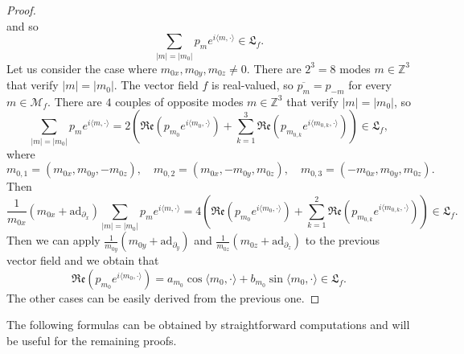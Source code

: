 \documentclass[10pt]{article}
\newcommand{\p}{\partial}
\newcommand{\Z}{{\mathbb Z}}
\newcommand{\M}{{\mathcal M}}
\newcommand{\ov}{\overline}
\newcommand{\la}{\langle}
\newcommand{\ra}{\rangle}
\newcommand{\ad}{\text{ad}}
\begin{document}
\begin{proof}
\begin{equation*}
    \end{equation*}
    and so 
    \begin{equation*}
        \sum_{|m|=|m_0|}p_me^{i\la m,\cdot \ra}\in \mathfrak{L}_f.
    \end{equation*} Let us consider the case where $m_{0x},m_{0y},m_{0z}\neq 0$. There are $2^{3}=8$ modes $m\in \Z^3$ that verify $|m|=|m_0|$. The vector field $f$ is real-valued, so $\ov{p_m}=p_{-m}$ for every $m\in \M_f$. There are $4$ couples of opposite modes $m\in\Z^3$ that verify $|m|=|m_0|$, so 
    \begin{equation*}
        \sum_{|m|=|m_0|}p_me^{i\la m,\cdot \ra}=2(\mathfrak{Re}(p_{m_0}e^{i\la m_0,\cdot\ra})+\sum_{k=1}^3\mathfrak{Re}(p_{m_{0,k}}e^{i\la m_{0,k},\cdot\ra}))\in \mathfrak{L}_f,
    \end{equation*}
    where 
    \begin{equation*}
       m_{0,1}=(m_{0x},m_{0y},-m_{0z}),\quad m_{0,2}=(m_{0x},-m_{0y},m_{0z}), \quad m_{0,3}=(-m_{0x},m_{0y},m_{0z}).
    \end{equation*}
     Then  
    \begin{equation*}
         \frac{1}{m_{0x}}(m_{0x}+\ad_{\p_x})\sum_{|m|=|m_0|}p_me^{i\la m,\cdot \ra}=4(\mathfrak{Re}(p_{m_0}e^{i\la m_0,\cdot\ra})+\sum_{k=1}^2\mathfrak{Re}(p_{m_{0,k}}e^{i\la m_{0,k},\cdot \ra}))\in \mathfrak{L}_f.
    \end{equation*}
    Then we can apply $\frac{1}{m_{0y}}(m_{0y}+\ad_{\p_y})$ and $\frac{1}{m_{0z}}(m_{0z}+\ad_{\p_z})$ to the previous vector field and we obtain that
    \begin{equation*}
        \mathfrak{Re}(p_{m_0} e^{i\la {m_0},\cdot \ra})=a_{m_0}\cos\la {m_0},\cdot \ra +b_{m_0}\sin \la {m_0},\cdot \ra\in \mathfrak{L}_f.
    \end{equation*}
    The other cases can be easily derived from the previous one.
\end{proof}

The following formulas can be obtained by straightforward computations and will be useful for the remaining proofs. 
\end{document}
